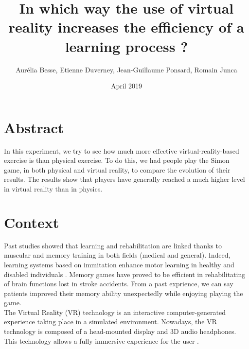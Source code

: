 \documentclass[12pt, openany, twocolumn]{article}
\title{In which way the use of virtual reality increases the efficiency of a learning process ?}
\author{ Aurélia Besse, Etienne Duverney, Jean-Guillaume Ponsard, Romain Junca }
\date{April 2019}
\begin{document}
\maketitle
\section{Abstract}

In this experiment, we try to see how much more effective virtual-reality-based exercise is than physical exercise. 
To do this, we had people play the Simon game, in both physical and virtual reality, to compare the evolution of their results. 
The results show that players have generally reached a much higher level in virtual reality than in physics.

\maketitle
\section{Context} 
Past studies showed that learning and rehabilitation are linked thanks to muscular and memory training in both fields (medical and general). 
Indeed, learning systems based on immitation enhance motor learning in healthy and disabled individuals \cite{holdenUseVirtualEnvironments, bastianUnderstandingSensorimotorAdaptation2008b}.
Memory games have proved to be efficient in rehabilitating of brain functions lost in stroke accidents. From a past exprience, we can say patients improved their memory ability unexpectedly while enjoying playing the game.
\\ 


The Virtual Reality (VR) technology is an interactive computer-generated experience taking place in a simulated environment. 
Nowadays, the VR technology is composed of a head-mounted display and 3D audio headphones.
This technology allows a fully immersive experience for the user \cite{sveistrupMotorRehabilitationUsing2004}.
\\
\end{document}
